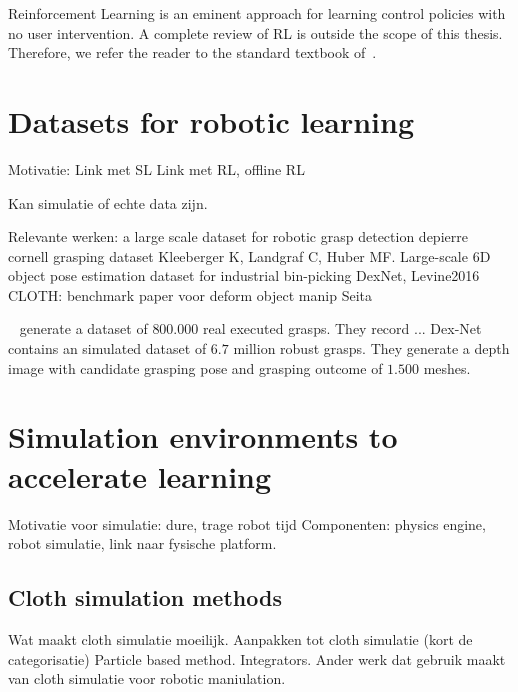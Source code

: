 \documentclass[\home/main.tex]{subfiles}
\begin{document}
Reinforcement Learning is an eminent approach for learning control policies with no user intervention. A complete review of RL is outside the scope of this thesis. Therefore, we refer the reader to the standard textbook of~\textcite{Sutton2018}.

\section{Datasets for robotic learning} \label{sec:lit_datasets}
Motivatie:
	Link met SL
	Link met RL, offline RL 

Kan simulatie of echte data zijn. 

Relevante werken:
	a large scale dataset for robotic grasp detection depierre
	cornell grasping dataset
	Kleeberger K, Landgraf C, Huber MF. Large-scale 6D object pose estimation dataset for industrial bin-picking
	DexNet, Levine2016
	CLOTH:
		benchmark paper voor deform object manip Seita 


~\textcite{Levine2016} generate a dataset of $800.000$ real executed grasps. They record ...
Dex-Net~\autocite{dexnet2} contains an simulated dataset of $6.7$ million robust grasps. They generate a depth image with candidate grasping pose and grasping outcome of $1.500$ meshes. 

\section{Simulation environments to accelerate learning} \label{sec:lit_simulation}

Motivatie voor simulatie: dure, trage robot tijd 
Componenten: physics engine, robot simulatie, link naar fysische platform.

\subsection{Cloth simulation methods} \label{subsec:lit_cloth_sim}

Wat maakt cloth simulatie moeilijk. 
Aanpakken tot cloth simulatie (kort de categorisatie)
Particle based method. 
Integrators. 
Ander werk dat gebruik maakt van cloth simulatie voor robotic maniulation.
\end{document}
